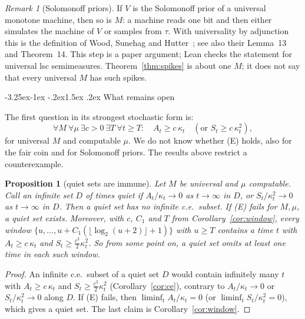 \documentclass[11pt]{article}
\makeatletter
\renewcommand\subsection{\@startsection{subsection}{2}{\z@}%
  {-3.25ex\@plus -1ex \@minus -.2ex}{1.5ex \@plus .2ex}%
  {\normalfont\large\bfseries\boldmath}}
\newtheorem{proposition}[theorem]{Proposition}
\theoremstyle{definition}
\theoremstyle{remark}
\newtheorem{remark}[theorem]{Remark}
\makeatother
\begin{document}
\begin{remark}[Solomonoff priors]
If $V$ is the Solomonoff prior of a universal monotone machine, then so is $M$:
a machine reads one bit and then either simulates the machine of $V$ or samples
from $\tau$. With universality by adjunction this is the definition of Wood,
Sunehag and Hutter~\cite[Def.~2]{woodsunehaghutter2013}; see also their Lemma~13
and Theorem~14. This step is a paper argument; Lean checks the statement for
universal lsc semimeasures. Theorem~\ref{thm:spikes} is about one $M$; it does
not say that every universal $M$ has such spikes.
\end{remark}

\subsection{What remains open}

The first question in its strongest stochastic form is:
\begin{equation}\label{eq:E}\tag{E}
\forall M\ \forall\mu\ \exists c>0\ \exists T\ \forall t\ge T:\quad
A_t\ge c\,\kappa_t\quad(\text{or } S_t\ge c\,\kappa_t^2),
\end{equation}
for universal $M$ and computable $\mu$. We do not know whether (E) holds,
also for the fair coin and for Solomonoff priors. The results above restrict a
counterexample.

\begin{proposition}[quiet sets are immune]\label{prop:immune}
Let $M$ be universal and $\mu$ computable. Call an infinite set $D$ of times
\emph{quiet} if $A_t/\kappa_t\to0$ as $t\to\infty$ in $D$, or
$S_t/\kappa_t^2\to0$ as $t\to\infty$ in $D$. Then a quiet set has no infinite
c.e.\ subset. If \textup{(E)} fails for $M,\mu$, a quiet set exists. Moreover, with
$c$, $C_1$ and $T$ from Corollary~\ref{cor:window}, every window
$\{u,\dots,u+C_1(\lfloor\log_2(u+2)\rfloor+1)\}$ with $u\ge T$ contains a time
$t$ with $A_t\ge c\,\kappa_t$ and $S_t\ge\frac{c^2}2\kappa_t^2$. So from some point on, a quiet set omits at
least one time in each such window.
\end{proposition}

\begin{proof}
An infinite c.e.\ subset of a quiet set $D$ would contain infinitely many $t$
with $A_t\ge c\,\kappa_t$ and $S_t\ge\frac{c^2}2\kappa_t^2$ (Corollary~\ref{cor:ce}),
contrary to $A_t/\kappa_t\to0$ or $S_t/\kappa_t^2\to0$ along $D$. If (E) fails, then
$\liminf_tA_t/\kappa_t=0$ (or $\liminf_tS_t/\kappa_t^2=0$), which gives a quiet set.
The last claim is Corollary~\ref{cor:window}.
\end{proof}
\end{document}

